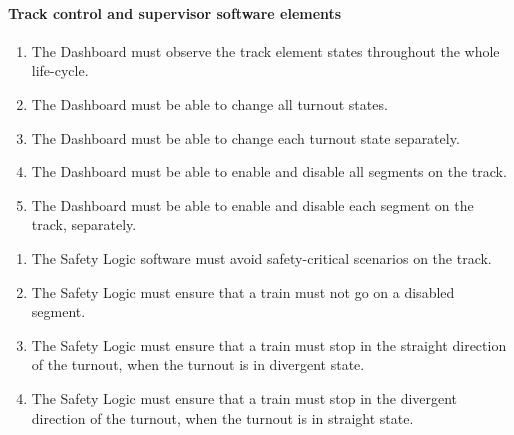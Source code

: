 \paragraph{Track control and supervisor software elements}

\begin{enumerate}[label=REQ-DB-\arabic*, leftmargin=*, format=\small]
	\item The Dashboard must observe the track element states throughout the whole life-cycle. \label{req:DB-1}
	\item The Dashboard must be able to change all turnout states. \label{req:DB-2}
	\item The Dashboard must be able to change each turnout state separately. \label{req:DB-3}
	\item The Dashboard must be able to enable and disable all segments on the track. \label{req:DB-4}
	\item The Dashboard must be able to enable and disable each segment on the track, separately. \label{req:DB-5}
\end{enumerate}


\begin{enumerate}[label=REQ-SL-\arabic*, leftmargin=*, format=\small]
	\item The Safety Logic software must avoid safety-critical scenarios on the track. \label{req:SL-1}
	\item The Safety Logic must ensure that a train must not go on a disabled segment. \label{req:SL-2}
	\item The Safety Logic must ensure that a train must stop in the straight direction of the turnout, when the turnout is in divergent state. \label{req:SL-3}
	\item The Safety Logic must ensure that a train must stop in the divergent direction of the turnout, when the turnout is in straight state. \label{req:SL-4}
\end{enumerate}
	


